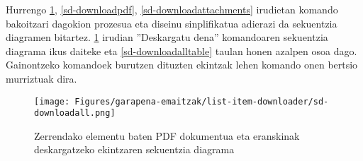 Hurrengo \ref{sd-downloadall}, \ref{sd-downloadpdf}, \ref{sd-downloadattachments} irudietan komando bakoitzari dagokion prozesua eta diseinu sinplifikatua adierazi da sekuentzia diagramen bitartez. \ref{sd-downloadall} irudian ''Deskargatu dena'' komandoaren sekuentzia diagrama ikus daiteke eta \ref{sd-downloadalltable} taulan honen azalpen osoa dago. Gainontzeko komandoek burutzen dituzten ekintzak lehen komando onen bertsio murriztuak dira. 

\vspace{1cm}
\begin{figure}[H]
\centering
\texttt{[image: Figures/garapena-emaitzak/list-item-downloader/sd-downloadall.png]}
\caption{Zerrendako elementu baten PDF dokumentua eta eranskinak deskargatzeko ekintzaren sekuentzia diagrama}
\label{sd-downloadall}
\end{figure}

\newpage

